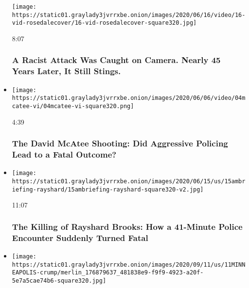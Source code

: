 \begin{itemize}
  \texttt{[image: https://static01.graylady3jvrrxbe.onion/images/2020/06/16/video/16-vid-rosedalecover/16-vid-rosedalecover-square320.jpg]}

  8:07

  \hypertarget{a-racist-attack-was-caught-on-camera-nearly-45-years-later-it-still-stings}{%
  \subsubsection{A Racist Attack Was Caught on Camera. Nearly 45 Years
  Later, It Still
  Stings.}\label{a-racist-attack-was-caught-on-camera-nearly-45-years-later-it-still-stings}}
\item
  \href{https://www.nytimes3xbfgragh.onion/video/us/100000007175316/the-david-mcatee-shooting-did-aggressive-policing-lead-to-a-fatal-outcome.html?action=click\&module=video-series-bar\&region=header\&pgtype=Article\&playlistId=video/dupont-race-policing}{}

  \texttt{[image: https://static01.graylady3jvrrxbe.onion/images/2020/06/06/video/04mcatee-vi/04mcatee-vi-square320.png]}

  4:39

  \hypertarget{the-david-mcatee-shooting-did-aggressive-policing-lead-to-a-fatal-outcome}{%
  \subsubsection{The David McAtee Shooting: Did Aggressive Policing Lead
  to a Fatal
  Outcome?}\label{the-david-mcatee-shooting-did-aggressive-policing-lead-to-a-fatal-outcome}}
\item
  \href{https://www.nytimes3xbfgragh.onion/video/us/100000007198581/rayshard-brooks-killing-garrett-rolfe.html?action=click\&module=video-series-bar\&region=header\&pgtype=Article\&playlistId=video/dupont-race-policing}{}

  \texttt{[image: https://static01.graylady3jvrrxbe.onion/images/2020/06/15/us/15ambriefing-rayshard/15ambriefing-rayshard-square320-v2.jpg]}

  11:07

  \hypertarget{the-killing-of-rayshard-brooks-how-a-41-minute-police-encounter-suddenly-turned-fatal}{%
  \subsubsection{The Killing of Rayshard Brooks: How a 41-Minute Police
  Encounter Suddenly Turned
  Fatal}\label{the-killing-of-rayshard-brooks-how-a-41-minute-police-encounter-suddenly-turned-fatal}}
\item
  \texttt{[image: https://static01.graylady3jvrrxbe.onion/images/2020/09/11/us/11MINNEAPOLIS-crump/merlin\_176879637\_481838e9-f9f9-4923-a20f-5e7a5cae74b6-square320.jpg]}


\end{itemize}
